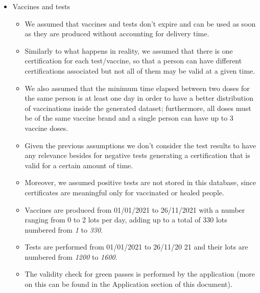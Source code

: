 \documentclass[12pt, a4paper]{article}
\begin{document}
\begin{itemize}

    \item Vaccines and tests
    \begin{itemize}
        \item[] We assumed that vaccines and tests don't expire and can be used 
            as soon as they are produced without accounting for delivery time.
        \item[] Similarly to what happens in reality, we assumed that there is one
            certification for each test/vaccine, so that a person can have different 
            certifications associated but not all of them may be valid at a given time.
        \item[] We also assumed that the minimum time elapsed between two doses
            for the same person is at least one day in order to have a better
            distribution of vaccinations inside the generated dataset;
            furthermore, all doses must be of the same vaccine brand and a
            single person can have up to 3 vaccine doses. 
        \item[] Given the previous assumptions we don't consider the test 
            results to have any relevance besides for negative tests
            generating a certification that is valid for a certain amount of 
            time.        
	\item[] Moreover, we assumed positive tests are not stored in this database, since
	certificates are meaningful only for vaccinated or healed people.
        \item[] Vaccines are produced from 01/01/2021 to 26/11/2021 with a
            number ranging from 0 to 2 lots per day, adding up to a total
            of 330 lots numbered from \emph{1} to \emph{330}.
        \item[] Tests are performed from 01/01/2021 to 26/11/20 21 and 
            their lots are numbered from \emph{1200} to \emph{1600}.
        \item[] The validity check for green passes is performed by the application 
            (more on this can be found in the Application section of this document).
    \end{itemize}


\end{itemize}
\end{document}
